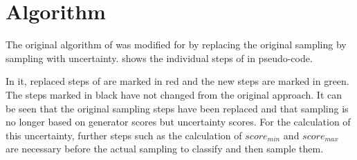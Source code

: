 \section{Algorithm}
\label{sec:algorithm}
%
The original algorithm of \kbgan was modified for \usgan by replacing the original sampling by sampling with uncertainty.
 shows the individual steps of \usgan in pseudo-code.

In it, replaced steps of \kbgan are marked in red and the new steps are marked in green.
The steps marked in black have not changed from the original approach.
It can be seen that the original sampling steps have been replaced and that sampling is no longer based on generator scores but uncertainty scores.
For the calculation of this uncertainty, further steps such as the calculation of $score_{min}$ and $score_{max}$ are necessary before the actual sampling to classify and then sample them.